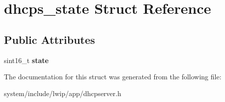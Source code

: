 \hypertarget{structdhcps__state}{}\section{dhcps\+\_\+state Struct Reference}
\label{structdhcps__state}
\subsection*{Public Attributes}
\begin{DoxyCompactItemize}
\item 
\hypertarget{structdhcps__state_a37f65b6dae98b17868e3d2737bc1b35b}{}sint16\+\_\+t {\bfseries state}\label{structdhcps__state_a37f65b6dae98b17868e3d2737bc1b35b}

\end{DoxyCompactItemize}


The documentation for this struct was generated from the following file\+:\begin{DoxyCompactItemize}
\item 
system/include/lwip/app/dhcpserver.\+h\end{DoxyCompactItemize}
